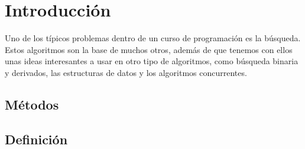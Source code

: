 \documentclass[12pt, fleqn]{article}                             %
\theoremstyle{break}                                            %
\begin{document}
\restoregeometry                                                    %
\nopagecolor                                                        %




\tableofcontents{}
\label{sec:Index}




\clearpage
\section{Introducción}


    Uno de los típicos problemas dentro de un curso de programación es la búsqueda.
    Estos algoritmos son la base de muchos otros, además de que tenemos con ellos unas ideas
    interesantes a usar en otro tipo de algoritmos, como búsqueda binaria y derivados, las
    estructuras de datos y los algoritmos concurrentes.

    \subsection{Métodos}

    \subsection{Definición}


\end{document}

